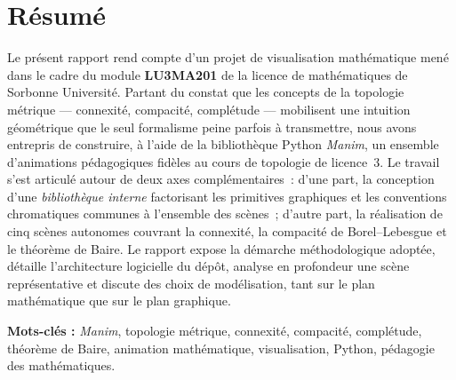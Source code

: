 \documentclass[12pt, a4paper, openany]{report}
\begin{document}
	\chapter*{Résumé}
	
	\begin{tcolorbox}[
		enhanced,
		colback=SorbonneBleu!3, colframe=SorbonneBleu!20,
		arc=3pt, boxrule=0.4pt,
		left=12pt, right=12pt, top=10pt, bottom=10pt,
		title={\textbf{Résumé}}, coltitle=SorbonneBleu, fonttitle=\large,
		attach boxed title to top left={yshift=-\tcboxedtitleheight/2, xshift=1em},
		boxed title style={colback=white, colframe=white, boxrule=0pt},
	]
		Le présent rapport rend compte d’un projet de visualisation mathématique mené dans le cadre du module \textbf{LU3MA201} de la licence de mathématiques de Sorbonne Université. Partant du constat que les concepts de la topologie métrique — connexité, compacité, complétude — mobilisent une intuition géométrique que le seul formalisme peine parfois à transmettre, nous avons entrepris de construire, à l’aide de la bibliothèque Python \textit{Manim}, un ensemble d’animations pédagogiques fidèles au cours de topologie de licence~3. Le travail s’est articulé autour de deux axes complémentaires~: d’une part, la conception d’une \emph{bibliothèque interne} factorisant les primitives graphiques et les conventions chromatiques communes à l’ensemble des scènes~; d’autre part, la réalisation de cinq scènes autonomes couvrant la connexité, la compacité de Borel--Lebesgue et le théorème de Baire. Le rapport expose la démarche méthodologique adoptée, détaille l’architecture logicielle du dépôt, analyse en profondeur une scène représentative et discute des choix de modélisation, tant sur le plan mathématique que sur le plan graphique.

		\medskip
		\textbf{Mots-clés :} \textit{Manim}, topologie métrique, connexité, compacité, complétude, théorème de Baire, animation mathématique, visualisation, Python, pédagogie des mathématiques.
	\end{tcolorbox}
	
	\vspace{1em}
	
\end{document}
